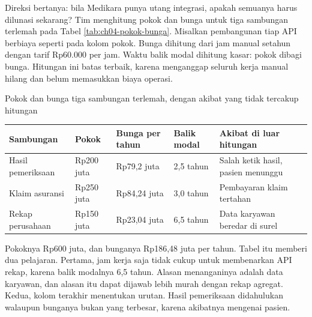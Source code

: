 \begin{kasus}[title={Kasus Medikara Health: Pokok dan Bunga Tiga Sambungan}]
Direksi bertanya: bila Medikara punya utang integrasi, apakah semuanya harus dilunasi sekarang? Tim
menghitung pokok dan bunga untuk tiga sambungan terlemah pada Tabel \ref{tab:ch04-pokok-bunga}. Misalkan
pembangunan tiap API berbiaya seperti pada kolom pokok. Bunga dihitung dari jam manual setahun dengan tarif
Rp60.000 per jam. Waktu balik modal dihitung kasar: pokok dibagi bunga. Hitungan ini batas terbaik, karena
menganggap seluruh kerja manual hilang dan belum memasukkan biaya operasi.

\begin{center}
  \begin{minipage}{\linewidth}
    \captionsetup{type=table}
    \caption{Pokok dan bunga tiga sambungan terlemah, dengan akibat yang tidak tercakup hitungan}
    \label{tab:ch04-pokok-bunga}
    \footnotesize
    \begin{tabularx}{\linewidth}{K{1.7cm}K{1.35cm}K{1.75cm}K{1.35cm}J}
      \hline
      \textbf{Sambungan} & \textbf{Pokok} & \textbf{Bunga per tahun} & \textbf{Balik modal} & \textbf{Akibat di luar hitungan} \\ \hline
      Hasil pemeriksaan & Rp200 juta & Rp79,2 juta & 2,5 tahun & Salah ketik hasil, pasien menunggu \\ \hline
      Klaim asuransi & Rp250 juta & Rp84,24 juta & 3,0 tahun & Pembayaran klaim tertahan \\ \hline
      Rekap perusahaan & Rp150 juta & Rp23,04 juta & 6,5 tahun & Data karyawan beredar di surel \\ \hline
    \end{tabularx}
  \end{minipage}
\end{center}

Pokoknya Rp600 juta, dan bunganya Rp186,48 juta per tahun. Tabel itu memberi dua pelajaran. Pertama, jam
kerja saja tidak cukup untuk membenarkan API rekap, karena balik modalnya 6,5 tahun. Alasan menanganinya
adalah data karyawan, dan alasan itu dapat dijawab lebih murah dengan rekap agregat. Kedua, kolom terakhir
menentukan urutan. Hasil pemeriksaan didahulukan walaupun bunganya bukan yang terbesar, karena akibatnya
mengenai pasien.
\end{kasus}


